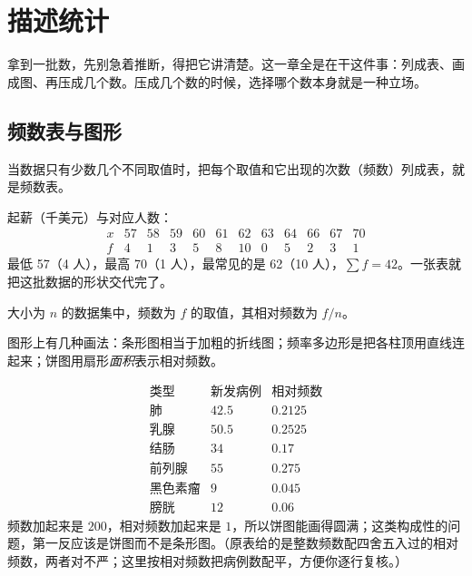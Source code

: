\section{描述统计}

拿到一批数，先别急着推断，得把它讲清楚。这一章全是在干这件事：列成表、画成图、再压成几个数。压成几个数的时候，选择哪个数本身就是一种立场。

\subsection{频数表与图形}

\begin{definition}[频数表]
当数据只有少数几个不同取值时，把每个取值和它出现的次数（频数）列成表，就是频数表。
\end{definition}

\begin{example}[42 位毕业生的起薪]
起薪（千美元）与对应人数：
\[
\begin{array}{c|ccccccccccc}
x & 57 & 58 & 59 & 60 & 61 & 62 & 63 & 64 & 66 & 67 & 70\\ \hline
f & 4 & 1 & 3 & 5 & 8 & 10 & 0 & 5 & 2 & 3 & 1
\end{array}
\]
最低 57（4 人），最高 70（1 人），最常见的是 62（10 人），$\sum f=42$。一张表就把这批数据的形状交代完了。
\end{example}

\begin{definition}[相对频数]
大小为 $n$ 的数据集中，频数为 $f$ 的取值，其相对频数为 $f/n$。
\end{definition}

图形上有几种画法：条形图相当于加粗的折线图；频率多边形是把各柱顶用直线连起来；饼图用扇形\emph{面积}表示相对频数。

\begin{example}[200 位癌症患者的病种分布]
\[
\begin{array}{c|cc}
\text{类型} & \text{新发病例} & \text{相对频数}\\ \hline
\text{肺} & 42.5 & 0.2125\\
\text{乳腺} & 50.5 & 0.2525\\
\text{结肠} & 34 & 0.17\\
\text{前列腺} & 55 & 0.275\\
\text{黑色素瘤} & 9 & 0.045\\
\text{膀胱} & 12 & 0.06
\end{array}
\]
频数加起来是 $200$，相对频数加起来是 $1$，所以饼图能画得圆满；这类构成性的问题，第一反应该是饼图而不是条形图。（原表给的是整数频数配四舍五入过的相对频数，两者对不严；这里按相对频数把病例数配平，方便你逐行复核。）
\end{example}

